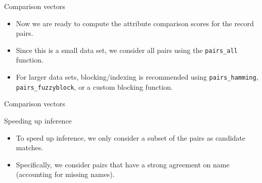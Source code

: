 \documentclass[
  ignorenonframetext,
]{beamer}
\newenvironment{Shaded}{\begin{snugshade}}{\end{snugshade}}
\newcommand{\DataTypeTok}[1]{\textcolor[rgb]{0.13,0.29,0.53}{#1}}
\newcommand{\KeywordTok}[1]{\textcolor[rgb]{0.13,0.29,0.53}{\textbf{#1}}}
\newcommand{\NormalTok}[1]{#1}
\newcommand{\OperatorTok}[1]{\textcolor[rgb]{0.81,0.36,0.00}{\textbf{#1}}}
\newcommand{\StringTok}[1]{\textcolor[rgb]{0.31,0.60,0.02}{#1}}
\begin{document}
\begin{frame}[fragile]{Comparison vectors}
\protect\hypertarget{comparison-vectors}{}

\begin{itemize}
\item
  Now we are ready to compute the attribute comparison scores for the
  record pairs.
\item
  Since this is a small data set, we consider all pairs using the
  \texttt{pairs\_all} function.
\item
  For larger data sets, blocking/indexing is recommended using
  \texttt{pairs\_hamming}, \texttt{pairs\_fuzzyblock}, or a custom
  blocking function.
\end{itemize}

\end{frame}

\begin{frame}[fragile]{Comparison vectors}
\protect\hypertarget{comparison-vectors-1}{}

\begin{Shaded}
\end{Shaded}

\end{frame}

\begin{frame}{Speeding up inference}
\protect\hypertarget{speeding-up-inference}{}

\begin{itemize}
\item
  To speed up inference, we only consider a subset of the pairs as
  candidate matches.
\item
  Specifically, we consider pairs that have a strong agreement on name
  (accounting for missing names).
\end{itemize}

\end{frame}
\end{document}
